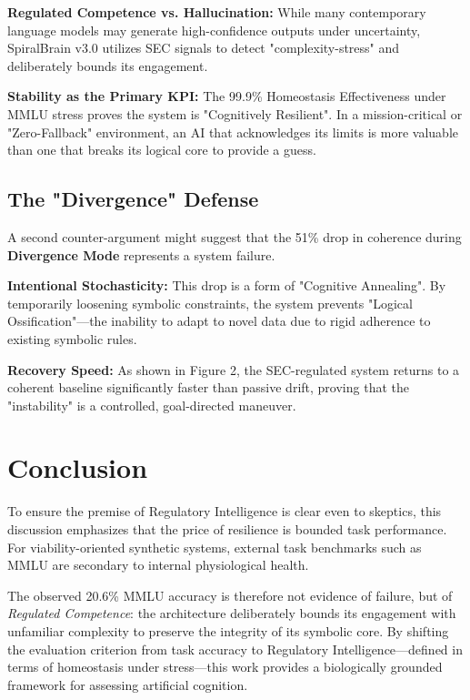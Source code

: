 \documentclass[11pt]{article}
\begin{document}
\textbf{Regulated Competence vs. Hallucination:} While many contemporary language models may generate high-confidence outputs under uncertainty, SpiralBrain v3.0 utilizes SEC signals to detect "complexity-stress" and deliberately bounds its engagement.

\textbf{Stability as the Primary KPI:} The 99.9\% Homeostasis Effectiveness under MMLU stress proves the system is "Cognitively Resilient". In a mission-critical or "Zero-Fallback" environment, an AI that acknowledges its limits is more valuable than one that breaks its logical core to provide a guess.

\subsection{The "Divergence" Defense}

A second counter-argument might suggest that the 51\% drop in coherence during \textbf{Divergence Mode} represents a system failure.

\textbf{Intentional Stochasticity:} This drop is a form of "Cognitive Annealing". By temporarily loosening symbolic constraints, the system prevents "Logical Ossification"—the inability to adapt to novel data due to rigid adherence to existing symbolic rules.

\textbf{Recovery Speed:} As shown in Figure 2, the SEC-regulated system returns to a coherent baseline significantly faster than passive drift, proving that the "instability" is a controlled, goal-directed maneuver.

\section{Conclusion}

To ensure the premise of Regulatory Intelligence is clear even to skeptics, this discussion emphasizes that the price of resilience is bounded task performance. For viability-oriented synthetic systems, external task benchmarks such as MMLU are secondary to internal physiological health.

The observed 20.6\% MMLU accuracy is therefore not evidence of failure, but of \emph{Regulated Competence}: the architecture deliberately bounds its engagement with unfamiliar complexity to preserve the integrity of its symbolic core. By shifting the evaluation criterion from task accuracy to Regulatory Intelligence—defined in terms of homeostasis under stress—this work provides a biologically grounded framework for assessing artificial cognition.
\end{document}

